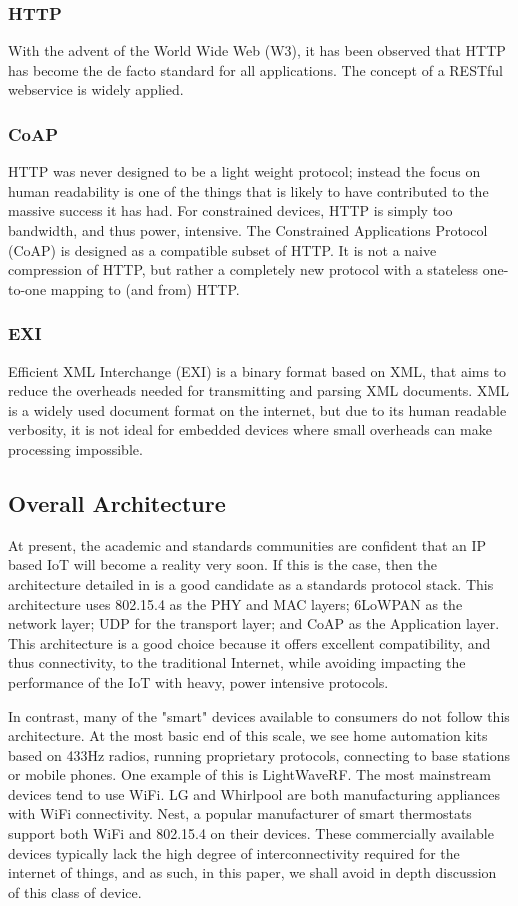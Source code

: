 \documentclass[10pt,journal,compsoc]{IEEEtran}
\begin{document}
\subsubsection{HTTP} 
With the advent of the World Wide Web (W3), it has been observed that HTTP has
become the de facto standard for all applications. The concept of a RESTful
webservice is widely applied.  

\subsubsection{CoAP}
HTTP was never designed to be a light weight protocol; instead the focus on
human readability is one of the things that is likely to have contributed to
the massive success it has had. For constrained devices, HTTP is simply too
bandwidth, and thus power, intensive. The Constrained Applications Protocol
(CoAP) is designed as a compatible subset of HTTP. It is not a naive
compression of HTTP, but rather a completely new protocol with a stateless
one-to-one mapping to (and from) HTTP. 

\subsubsection{EXI}
Efficient XML Interchange (EXI) is a binary format based on XML, that aims to
reduce the overheads needed for transmitting and parsing XML documents. XML is
a widely used document format on the internet, but due to its human readable
verbosity, it is not ideal for embedded devices where small overheads can make
processing impossible. 

\subsection{Overall Architecture}
At present, the academic and standards communities are confident that an IP
based IoT will become a reality very soon. If this is the case, then the
architecture detailed in \cite{Palattella2013} is a good candidate as a
standards protocol stack. This architecture uses 802.15.4 as the PHY and MAC
layers; 6LoWPAN as the network layer; UDP for the transport layer; and CoAP as
the Application layer. This architecture is a good choice because it offers
excellent compatibility, and thus connectivity, to the traditional Internet,
while avoiding impacting the performance of the IoT with heavy, power intensive
protocols. 

In contrast, many of the "smart" devices available to consumers do not follow
this architecture. At the most basic end of this scale, we see home automation
kits based on 433Hz radios, running proprietary protocols, connecting to base
stations or mobile phones. One example of this is LightWaveRF. The most
mainstream devices tend to use WiFi. LG and Whirlpool are both manufacturing
appliances with WiFi connectivity. Nest, a popular manufacturer of smart
thermostats support both WiFi and 802.15.4 on their devices.  These
commercially available devices typically lack the high degree of
interconnectivity required for the internet of things, and as such, in this
paper, we shall avoid in depth discussion of this class of device.  
\end{document}
